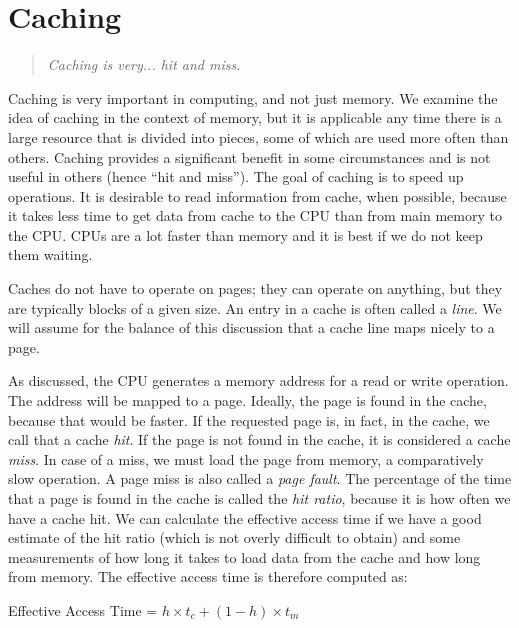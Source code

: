 




\section*{Caching}
\begin{quote}
\textit{Caching is very... hit and miss.}
\end{quote}


Caching is very important in computing, and not just memory. We examine the idea of caching in the context of memory, but it is applicable any time there is a large resource that is divided into pieces, some of which are used more often than others. Caching provides a significant benefit in some circumstances and is not useful in others (hence ``hit and miss''). The goal of caching is to speed up operations. It is desirable to read information from cache, when possible, because it takes less time to get data from cache to the CPU than from main memory to the CPU. CPUs are a lot faster than memory and it is best if we do not keep them waiting.

Caches do not have to operate on pages; they can operate on anything, but they are typically blocks of a given size. An entry in a cache is often called a \textit{line}. We will assume for the balance of this discussion that a cache line maps nicely to a page.

As discussed, the CPU generates a memory address for a read or write operation. The address will be mapped to a page. Ideally, the page is found in the cache, because that would be faster. If the requested page is, in fact,  in the cache, we call that a cache \textit{hit}. If the page is not found in the cache, it is considered a cache \textit{miss}. In case of a miss, we must load the page from memory, a comparatively slow operation. A page miss is also called a \textit{page fault}. The percentage of the time that a page is found in the cache is called the \textit{hit ratio}, because it is how often we have a cache hit. We can calculate the effective access time if we have a good estimate of the hit ratio (which is not overly difficult to obtain) and some measurements of how long it takes to load data from the cache and how long from memory. The effective access time is therefore computed as:

\begin{center}
Effective Access Time = $h \times t_{c} + (1-h) \times t_{m}$
\end{center}

